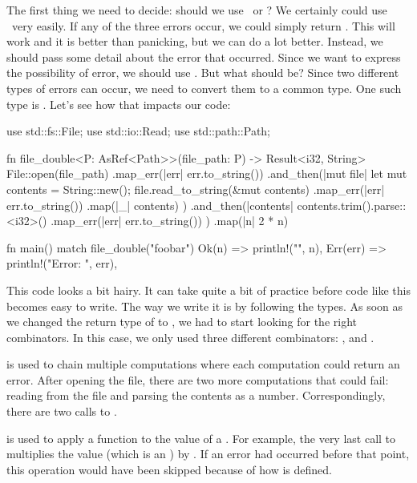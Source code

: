 \blank

The first thing we need to decide: should we use \option\ or \result? We certainly could use \option\ very easily. If any 
of the three errors occur, we could simply return \none. This will work and it is better than panicking, but we can do a 
lot better. Instead, we should pass some detail about the error that occurred. Since we want to express the possibility of 
error, we should use . But what should  be? Since two different types of errors can occur, we 
need to convert them to a common type. One such type is \String. Let's see how that impacts our code:

\begin{rustc}
use std::fs::File;
use std::io::Read;
use std::path::Path;

fn file_double<P: AsRef<Path>>(file_path: P) -> Result<i32, String> {
    File::open(file_path)
         .map_err(|err| err.to_string())
         .and_then(|mut file| {
              let mut contents = String::new();
              file.read_to_string(&mut contents)
                  .map_err(|err| err.to_string())
                  .map(|_| contents)
         })
         .and_then(|contents| {
              contents.trim().parse::<i32>()
                      .map_err(|err| err.to_string())
         })
         .map(|n| 2 * n)
}

fn main() {
    match file_double("foobar") {
        Ok(n) => println!("{}", n),
        Err(err) => println!("Error: {}", err),
    }
}
\end{rustc}

This code looks a bit hairy. It can take quite a bit of practice before code like this becomes easy to write. The way we 
write it is by following the types. As soon as we changed the return type of  to , 
we had to start looking for the right combinators. In this case, we only used three different combinators: 
,  and .

\blank

 is used to chain multiple computations where each computation could return an error. After opening the file, 
there are two more computations that could fail: reading from the file and parsing the contents as a number. Correspondingly, 
there are two calls to .

\blank

 is used to apply a function to the  value of a \result. For example, the very last call to 
multiplies the  value (which is an \itt) by . If an error had occurred before that point, this operation 
would have been skipped because of how  is defined.

